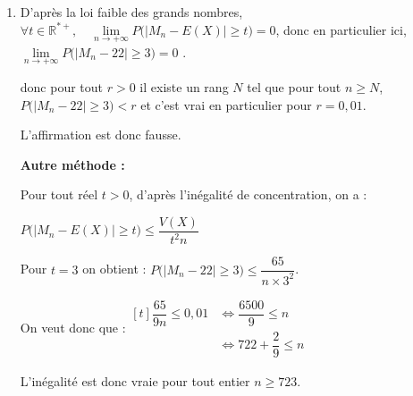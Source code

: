 \documentclass[10pt]{article}
\providecommand{\R}{\mathbb{R}}
\begin{document}
\begin{enumerate}
\item 



D'après la loi faible des grands nombres, $\forall t \in \R^{*+}, \quad \lim\limits_{n \to +\infty} P\Big(\big|M_n - E(X)\big| \geqslant t\Big) = 0$, donc en particulier ici,  $\lim\limits_{n \to +\infty} P\Big(\big|M_n - 22\big| \geqslant 3\Big) = 0$ .


donc pour tout $r>0$ il existe un rang $N$ tel que pour tout $n \geqslant N$, $P\big(\left|M_{n}-22\right| \geqslant 3\big)< r$ et c'est vrai en particulier pour $r=0,01$.


L'affirmation est donc fausse.

\textbf{Autre méthode : }

Pour tout réel $t>0$, d'après l'inégalité de  concentration, on a :

$ P\big(\left|M_n-E(X)\right| \geqslant t\big) \leqslant \dfrac{V(X)}{t^2 n}$

	Pour $t=3$ on obtient :  $ P\big(|M_n-22| \geqslant 3\big)\leqslant \dfrac{65}{ n \times 3^2}$.



On veut donc que  :\quad $\begin{aligned}[t]
	 \dfrac{65}{9 n} \leqslant 0,01 &\iff
	 \dfrac{6500}{9} \leqslant n \\
	 &\iff 722+\dfrac{2}{9}\leqslant n
\end{aligned}$

L'inégalité est donc vraie pour tout entier $n \geqslant 723$.



\end{enumerate}



\bigskip
\end{document}
